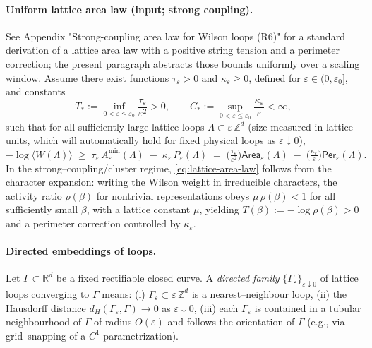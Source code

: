 \documentclass[11pt]{amsart}
\begin{document}
\paragraph{Uniform lattice area law (input; strong coupling).}
See Appendix "Strong-coupling area law for Wilson loops (R6)" for a standard derivation of a lattice area law with a positive string tension and a perimeter correction; the present paragraph abstracts those bounds uniformly over a scaling window.
Assume there exist functions $\tau_\varepsilon>0$ and $\kappa_\varepsilon\ge 0$, defined for $\varepsilon\in (0,\varepsilon_0]$, and constants
\[
  T_*:=\inf_{0<\varepsilon\le\varepsilon_0}\frac{\tau_\varepsilon}{\varepsilon^2}>0,\qquad
  C_*:=\sup_{0<\varepsilon\le\varepsilon_0}\frac{\kappa_\varepsilon}{\varepsilon}<\infty,
\]
such that for all sufficiently large lattice loops $\Lambda\subset\varepsilon\,\mathbb{Z}^d$ (size measured in lattice units, which will automatically hold for fixed physical loops as $\varepsilon\downarrow 0$),
\begin{equation}
\label{eq:lattice-area-law}
  -\log\langle W(\Lambda)\rangle \;\ge\; \tau_\varepsilon\,A_\varepsilon^{\min}(\Lambda)\;-
  \;\kappa_\varepsilon\,P_\varepsilon(\Lambda)
  \;=\;\Big(\tfrac{\tau_\varepsilon}{\varepsilon^2}\Big)\mathsf{Area}_\varepsilon(\Lambda)\;-
  \;\Big(\tfrac{\kappa_\varepsilon}{\varepsilon}\Big)\mathsf{Per}_\varepsilon(\Lambda).
\end{equation}
In the strong--coupling/cluster regime, \eqref{eq:lattice-area-law} follows from the character expansion: writing the Wilson weight in irreducible characters, the activity ratio $\rho(\beta)$ for nontrivial representations obeys $\mu\,\rho(\beta) < 1$ for all sufficiently small $\beta$, with a lattice constant $\mu$, yielding $T(\beta):= -\log \rho(\beta) > 0$ and a perimeter correction controlled by $\kappa_\varepsilon$.

\paragraph{Directed embeddings of loops.}
Let $\Gamma\subset\mathbb{R}^d$ be a fixed rectifiable closed curve. A \emph{directed family} $\{\Gamma_\varepsilon\}_{\varepsilon\downarrow 0}$ of lattice loops converging to $\Gamma$ means: (i) $\Gamma_\varepsilon\subset\varepsilon\,\mathbb{Z}^d$ is a nearest--neighbour loop, (ii) the Hausdorff distance $d_H(\Gamma_\varepsilon,\Gamma)\to 0$ as $\varepsilon\downarrow 0$, (iii) each $\Gamma_\varepsilon$ is contained in a tubular neighbourhood of $\Gamma$ of radius $O(\varepsilon)$ and follows the orientation of $\Gamma$ (e.g., via grid--snapping of a $C^1$ parametrization).
\end{document}
